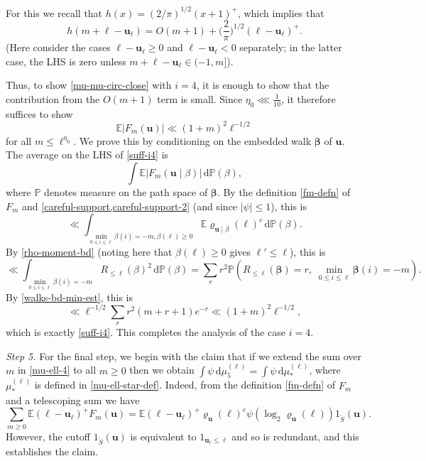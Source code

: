 \documentclass[11pt,reqno]{amsart}
\numberwithin{equation}{section}
\theoremstyle{definition}
\theoremstyle{remark}
\newcommand{\mb}{\mathbb}
\newcommand{\mbf}{\mathbf}
\def\boldbeta{\boldsymbol\beta}
\renewcommand{\le}{\leqslant}
\renewcommand{\ge}{\geqslant}
\begin{document}
For this we recall that $h(x) = (2/\pi)^{1/2} (x + 1)^+$, which implies that  
\[ h(m + \ell - \mbf{u}_{\ell}) = O(m+1) +  \big(\frac{2}{\pi}\big)^{1/2} (\ell - \mbf{u}_{\ell})^+.\]  (Here consider the cases $\ell - \mbf{u}_\ell \ge 0$ and $\ell - \mbf{u}_{\ell} < 0$ separately; in the latter case, the LHS is zero unless $m + \ell - \mbf{u}_{\ell} \in (-1,m]$). 

Thus, to show \cref{mu-mu-circ-close} with $i = 4$, it is enough to show that the contribution from the $O(m+1)$ term is small. Since $\eta_0 \lll \frac{1}{10}$, it therefore suffices to show
\begin{equation}\label{suff-i4} \mb{E} |F_m(\mbf{u})| \ll (1 + m)^{2}\ell^{-1/2}\end{equation} for all $m \le \ell^{\eta_0}$.
We prove this by conditioning on the embedded walk $\boldbeta$ of $\mbf{u}$. The average on the LHS of \cref{suff-i4} is 
\[ \int \mb{E} |F_m(\mbf{u} \mid \beta)|\, \mathrm{d}\mb{P}(\beta),\] where $\mb{P}$ denotes measure on the path space of $\boldbeta$. By the definition \cref{fm-defn} of $F_m$ and \cref{careful-support,careful-support-2} (and since $|\psi| \le 1$), this is
\[ \ll \int_{\min_{0 \le i \le \ell} \beta(i) = -m, \beta(\ell) \ge 0}  \mb{E} \varrho_{\mbf{u} \mid \beta}(\ell)^c\, \mathrm{d}\mb{P}(\beta).\] By \cref{rho-moment-bd} (noting here that $\beta(\ell) \ge 0$ gives $\ell' \le \ell$), this is 
\[ \ll \int_{\min_{0 \le i \le \ell} \beta(i) = -m}  R_{\le \ell}(\beta)^2 \, \mathrm{d} \mb{P}(\beta)= \sum_r r^2 \mb{P}(R_{\le \ell}(\boldbeta) = r, \; \min_{0 \le i \le \ell} \boldbeta(i) = -m).\] 
By \cref{walks-bd-min-est}, this is 
\[ \ll \ell^{-1/2} \sum_{r} r^2 (m + r + 1) e^{-r} \ll (1 + m)^{2} \ell^{-1/2},\]
which is exactly \cref{suff-i4}. This completes the analysis of the case $i = 4$.\vspace*{10pt}


\emph{Step 5.} For the final step, we begin with the claim that if we extend the sum over $m$ in \cref{mu-ell-4} to all $m \ge 0$ then we obtain $\int \psi \, \mathrm{d} \mu_5^{(\ell)} = \int \psi \, \mathrm{d} \mu_*^{(\ell)}$, where $\mu_*^{(\ell)}$ is defined in \cref{mu-ell-star-def}. Indeed, from the definition \cref{fm-defn} of $F_m$ and a telescoping sum we have
\[
 \sum_{m \ge 0}\mb{E} (\ell - \mbf{u}_{\ell})^+ F_m(\mbf{u}) =    \mb{E} (\ell - \mbf{u}_{\ell})^+\varrho_{\mbf{u}}(\ell)^c \psi(\log_2 \varrho_{\mbf{u}}(\ell)) 1_{\tilde{S}}(\mbf{u}).
\]
However, the cutoff $1_{\tilde S}(\mbf{u})$ is equivalent to $1_{\mbf{u}_{\ell} \le \ell}$ and so is redundant, and this establishes the claim.
\end{document}
